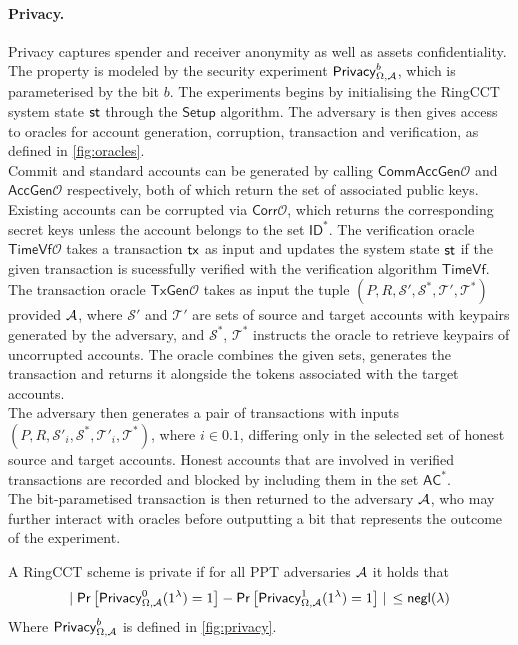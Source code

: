 \paragraph*{Privacy.} Privacy captures spender and receiver anonymity as well as assets confidentiality. The property is modeled by the security experiment $\mathsf{Privacy}_{\Omega,\mathcal{A}}^b$, which is parameterised by the bit $b$. The experiments begins by initialising the RingCCT system state $\st$ through the $\mathsf{Setup}$ algorithm. The adversary is then gives access to oracles for account generation, corruption, transaction and verification, as defined in \ref{fig:oracles}. \\
Commit and standard accounts can be generated by calling $\mathsf{CommAccGen}\mathcal{O}$ and $\mathsf{AccGen}\mathcal{O}$ respectively, both of which return the set of associated public keys. Existing accounts can be corrupted via $\mathsf{Corr}\mathcal{O}$, which returns the corresponding secret keys unless the account belongs to the set $\mathsf{ID}^*$. The verification oracle $\mathsf{TimeVf}\mathcal{O}$ takes a transaction $\mathsf{tx}$ as input and updates the system state $\st$ if the given transaction is sucessfully verified with the verification algorithm $\mathsf{TimeVf}$. \\
The transaction oracle $\mathsf{TxGen}\mathcal{O}$ takes as input the tuple $(P, R, \mathcal{S}', \mathcal{S}^*, \mathcal{T}', \mathcal{T}^*)$ provided $\mathcal{A}$, where $\mathcal{S}'$ and $\mathcal{T}'$ are sets of source and target accounts with keypairs generated by the adversary, and $\mathcal{S}^*$, $\mathcal{T}^*$ instructs the oracle to retrieve keypairs of uncorrupted accounts. The oracle combines the given sets, generates the transaction and returns it alongside the tokens associated with the target accounts. \\ 
The adversary then generates a pair of transactions with inputs $(P, R, \mathcal{S}'_i, \mathcal{S}^*, \mathcal{T}'_i, \mathcal{T}^*)$, where $i \in {0.1}$, differing only in the selected set of honest source and target accounts. Honest accounts that are involved in verified transactions are recorded and blocked by including them in the set $\mathsf{AC}^*$. \\
The bit-parametised transaction is then returned to the adversary $\mathcal{A}$, who may further interact with oracles before outputting a bit that represents the outcome of the experiment.

\begin{definition}[Privacy] A RingCCT scheme is private if for all PPT adversaries $\mathcal{A}$ it holds that
\begin{equation*}
\mid \mathsf{Pr}\left[\mathsf{Privacy}_{\Omega,\adv}^0(1^\lambda) = 1\right] -  \mathsf{Pr}\left[\mathsf{Privacy}_{\Omega,\adv}^1(1^\lambda) = 1\right] \mid \:\: \leq \negl
\end{equation*}
Where $\mathsf{Privacy}_{\Omega,\mathcal{A}}^b$ is defined in \ref{fig:privacy}. 
\end{definition}

